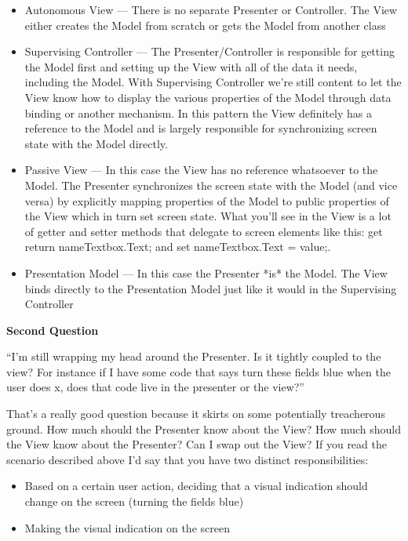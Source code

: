 \documentclass{article}
\begin{document}
{ \begin{itemize}
     \item  Autonomous View — There is no separate Presenter or Controller.  The View either creates the Model from scratch or gets the Model from another class  \vspace{2pt}
 \item  Supervising Controller — The Presenter/Controller is responsible for getting the Model first and setting up the View with all of the data it needs, including the Model.  With Supervising Controller we're still content to let the View know how to display the various properties of the Model through data binding or another mechanism.  In this pattern the View definitely has a reference to the Model and is largely responsible for synchronizing screen state with the Model directly.  \vspace{2pt}
 \item  Passive View — In this case the View has no reference whatsoever to the Model.  The Presenter synchronizes the screen state with the Model (and vice versa) by explicitly mapping properties of the Model to public properties of the View which in turn set screen state.  What you'll see in the View is a lot of getter and setter methods that delegate to screen elements like this:  get {return nameTextbox.Text;} and set {nameTextbox.Text = value;}.  \vspace{2pt}
 \item  Presentation Model — In this case the Presenter *is* the Model.  The View binds directly to the Presentation Model just like it would in the Supervising Controller  \vspace{2pt}
 \end{itemize}
 
\Large {\textbf{Second Question}}

    “I'm still wrapping my head around the Presenter.  Is it tightly coupled to the view?  For instance if I have some code that says turn these fields blue when the user does x, does that code live in the presenter or the view?”

That's a really good question because it skirts on some potentially treacherous ground.  How much should the Presenter know about the View?  How much should the View know about the Presenter?  Can I swap out the View?  If you read the scenario described above I'd say that you have two distinct responsibilities:
 \begin{itemize}
  \item    Based on a certain user action, deciding that a visual indication should change on the screen (turning the fields blue) \vspace{2pt}
  \item    Making the visual indication on the screen
\end{itemize}

}
\end{document}

